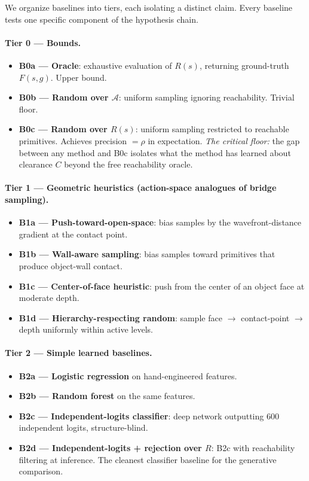 \documentclass[11pt]{article}
\begin{document}
We organize baselines into tiers, each isolating a distinct claim. Every
baseline tests one specific component of the hypothesis chain.

\paragraph{Tier 0 --- Bounds.}
\begin{itemize}[leftmargin=2em,itemsep=0pt]
  \item \textbf{B0a --- Oracle}: exhaustive evaluation of $R(s)$, returning
        ground-truth $F(s,g)$. Upper bound.
  \item \textbf{B0b --- Random over $\mathcal{A}$}: uniform sampling
        ignoring reachability. Trivial floor.
  \item \textbf{B0c --- Random over $R(s)$}: uniform sampling restricted to
        reachable primitives. Achieves precision $= \rho$ in expectation.
        \emph{The critical floor:} the gap between any method and B0c
        isolates what the method has learned about clearance $C$ beyond the
        free reachability oracle.
\end{itemize}

\paragraph{Tier 1 --- Geometric heuristics (action-space analogues of bridge sampling).}
\begin{itemize}[leftmargin=2em,itemsep=0pt]
  \item \textbf{B1a --- Push-toward-open-space}: bias samples by the
        wavefront-distance gradient at the contact point.
  \item \textbf{B1b --- Wall-aware sampling}: bias samples toward primitives
        that produce object-wall contact.
  \item \textbf{B1c --- Center-of-face heuristic}: push from the center of
        an object face at moderate depth.
  \item \textbf{B1d --- Hierarchy-respecting random}: sample face $\to$
        contact-point $\to$ depth uniformly within active levels.
\end{itemize}

\paragraph{Tier 2 --- Simple learned baselines.}
\begin{itemize}[leftmargin=2em,itemsep=0pt]
  \item \textbf{B2a --- Logistic regression} on hand-engineered features.
  \item \textbf{B2b --- Random forest} on the same features.
  \item \textbf{B2c --- Independent-logits classifier}: deep network
        outputting 600 independent logits, structure-blind.
  \item \textbf{B2d --- Independent-logits + rejection over $R$}: B2c with
        reachability filtering at inference. The cleanest classifier baseline
        for the generative comparison.
\end{itemize}
\end{document}
